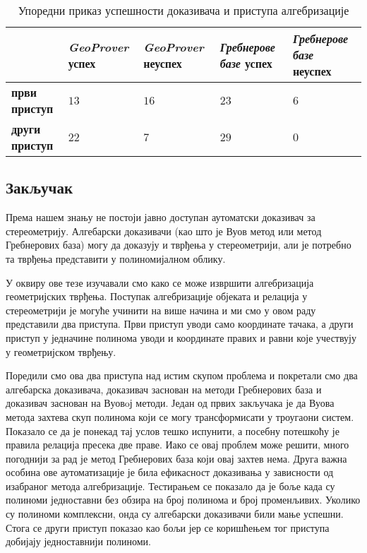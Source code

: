 \begin{table}[hb]
\begin{center}
\begin{tabular}{L{2cm}||R{2cm}|R{2cm}|R{2cm}|R{2cm}}
\                      & \emph{GeoProver} успех & \emph{GeoProver} неуспех & \emph{Гребнерове базе} успех & \emph{Гребнерове базе} неуспех \\
\hline
\hline
\textbf{први приступ}  &  $13$                  & $16$                     &  $23$                        & $6$  \\
\hline
\textbf{други приступ} &  $22$                  & $7$                      &  $29$                        & $0$ \\
\end{tabular}

\caption{Упоредни приказ успешности доказивача и приступа алгебризације}
\end{center}
\end{table}


\subsection{Закључак}

Према нашем знању не постоји јавно доступан аутоматски доказивач за
стереометрију. Алгебарски доказивачи (као што је Вуов метод или метод
Гребнерових база) могу да доказују и тврђења у стереометрији, али је
потребно та тврђења представити у полиномијалном облику. 

У оквиру ове тезе изучавали смо како се може извршити алгебризација
геометријских тврђења. Поступак алгебризације објеката и релација у
стереометрији је могуће учинити на више начина и ми смо у овом раду
представили два приступа. Први приступ уводи само координате тачака, а
други приступ у једначине полинома уводи и координате правих и равни
које учествују у геометријском тврђењу.

Поредили смо ова два приступа над истим скупом проблема и покретали
смо два алгебарска доказивача, доказивач заснован на методи
Гребнерових база и доказивач заснован на Вуовoј методи. Један од првих
закључака је да Вуова метода захтева скуп полинома који се могу
трансформисати у троугаони систем. Показало се да је понекад тај услов
тешко испунити, а посебну потешкоћу је правила релација пресека две
праве. Иако се овај проблем може решити, много погоднији за рад је
метод Гребнерових база који овај захтев нема. Друга важна особина ове
аутоматизације је била ефикасност доказивања у зависности од изабраног
метода алгебризације. Тестирањем се показало да је боље када су
полиноми једноставни без обзира на број полинома и број
променљивих. Уколико су полиноми комплексни, онда су алгебарски
доказивачи били мање успешни. Стога се други приступ показао као бољи
јер се коришћењем тог приступа добијају једноставнији полиноми.


